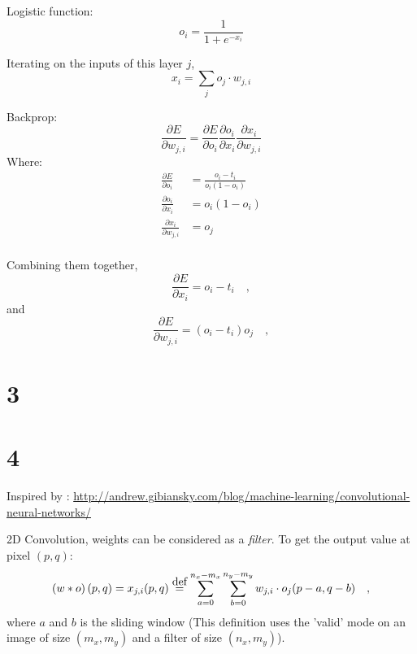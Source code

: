 \documentclass[12pt]{article}
\begin{document}
Logistic function:
\begin{equation}
o_i = \frac{1}{1+e^{-x_i}}
\end{equation}

Iterating on the inputs of this layer $j$,
\begin{equation}
x_i = \sum_j o_j \cdot w_{j,i}
\end{equation}

Backprop:
\begin{equation}
\frac{\partial E}{\partial w_{j,i}} = \frac{\partial E}{\partial o_i} \frac{\partial o_i}{\partial x_i} \frac{\partial x_i}{\partial w_{j,i}}
\end{equation}
Where:
\begin{eqnarray}
\frac{\partial E}{\partial o_i} &= \frac{o_i - t_i}{o_i \left(1 - o_i \right)} \\
\frac{\partial o_i}{\partial x_i} &= o_i \left(1 - o_i \right) \\
\frac{\partial x_i}{\partial w_{j,i}} &= o_j \\
\end{eqnarray}

Combining them together,
\begin{equation}
\frac{\partial E}{\partial x_i} = o_i - t_i
\quad,
\end{equation}
and
\begin{equation}
\frac{\partial E}{\partial w_{j,i}} = \left( o_i - t_i \right) o_j
\quad,
\end{equation}


\section*{3}


\section*{4}
Inspired by : \url{http://andrew.gibiansky.com/blog/machine-learning/convolutional-neural-networks/}

2D Convolution, weights can be considered as a \emph{filter}. To get the output value at pixel $(p, q)$:
\begin{equation}
\left( w \ast o \right)(p, q) = x_{j,i}(p, q) \; \stackrel{\mathclap{\normalfont\mbox{def}}}{=} \; \sum_{a=0}^{n_x-m_x} \sum_{b=0}^{n_y-m_y} w_{j,i} \cdot o_j(p-a, q-b)
\quad,
\end{equation}
where $a$ and $b$ is the sliding window (This definition uses the 'valid' mode on an image of size $\left( m_x, m_y \right)$ and a filter of size $\left( n_x, m_y \right)$).
\end{document}
